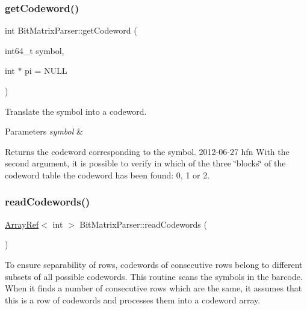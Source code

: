 \subsubsection{\texorpdfstring{get\+Codeword()}{getCodeword()}}
{\footnotesize\ttfamily int Bit\+Matrix\+Parser\+::get\+Codeword (\begin{DoxyParamCaption}\item[{int64\+\_\+t}]{symbol,  }\item[{int $\ast$}]{pi = {\ttfamily NULL} }\end{DoxyParamCaption})\hspace{0.3cm}{\ttfamily [static]}}

Translate the symbol into a codeword.


\begin{DoxyParams}{Parameters}
{\em symbol} & \\
\hline
\end{DoxyParams}
\begin{DoxyReturn}{Returns}
the codeword corresponding to the symbol. 2012-\/06-\/27 hfn With the second argument, it is possible to verify in which of the three \char`\"{}blocks\char`\"{} of the codeword table the codeword has been found\+: 0, 1 or 2. 
\end{DoxyReturn}
\mbox{\label{classzxing_1_1pdf417_1_1decoder_1_1_bit_matrix_parser_a333c690ca4065e69b693202f2f0832c7}} 
\subsubsection{\texorpdfstring{read\+Codewords()}{readCodewords()}}
{\footnotesize\ttfamily \mbox{\hyperlink{classzxing_1_1_array_ref}{Array\+Ref}}$<$ int $>$ Bit\+Matrix\+Parser\+::read\+Codewords (\begin{DoxyParamCaption}{ }\end{DoxyParamCaption})}

To ensure separability of rows, codewords of consecutive rows belong to different subsets of all possible codewords. This routine scans the symbols in the barcode. When it finds a number of consecutive rows which are the same, it assumes that this is a row of codewords and processes them into a codeword array.

